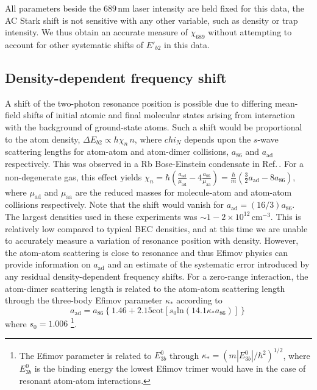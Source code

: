 All parameters beside the $689$\,nm laser intensity are held fixed for this data, the AC Stark shift is not sensitive  with any other variable, such as density or trap intensity.
We thus obtain an accurate measure of $\chi_{689}$ without attempting to account for other systematic shifts of $E'_{b2}$ in this data.

\subsection{Density-dependent frequency shift}
A shift of the two-photon resonance position is possible due to differing mean-field shifts of initial atomic and final molecular states arising from interaction with the background of ground-state atoms.
Such a shift would be proportional to the atom density, $\Delta E_{b2} \propto h \chi_n\,n$, where $chi_N$ depends upon the $s$-wave scattering lengths for atom-atom and atom-dimer collisions, $a_{86}$ and $a_{\text{ad}}$ respectively.
This was observed in a Rb Bose-Einstein condensate in Ref.\,\cite{Wynar2000}. 
For a non-degenerate gas, this effect yields $\chi_n=\hbar (\frac{a_{\text{ad}}}{\mu_{\text{ad}}}-4\frac{a_{86}}{\mu_{\text{aa}}})=\frac{\hbar}{m} (\frac{3 }{2}a_{\text{ad}}-8 a_{86})$, where $\mu_{\text{ad}}$ and $\mu_{\text{aa}}$ are the reduced masses for molecule-atom and atom-atom collisions respectively.
Note that the shift would vanish for $a_{\text{ad}}=(16/3) a_{86}$.
The largest densities used in these experiments was $\sim 1-2\times 10^{12}\,\mathrm{cm}^{-3}$.
This is relatively low compared to typical BEC densities, and at this time we are unable to accurately measure a variation of resonance position with density.
However, the atom-atom scattering is close to resonance and thus Efimov physics can provide information on $a_{\text{ad}}$ \cite{bha07,nen17} and an estimate of the systematic error introduced by any residual density-dependent frequency shifts.
For a zero-range interaction, the atom-dimer scattering length is related to the atom-atom scattering length through the three-body Efimov parameter $\kappa_*$ according to \cite{bha07}
\begin{equation}\label{Eq:EfimovMoleculAtomScatteringLength}
  a_{\text{ad}}=a_{86}\left\{1.46 + 2.15 \mathrm{cot}[s_0 \mathrm{ln} (14.1\kappa_* a_{86}) ]\right\}
\end{equation}
where $s_0=1.006$ \footnote{The Efimov parameter is related to $E^0_{3b}$ through $\kappa_*=(m|E^0_{3b}|/\hbar^2)^{1/2}$, where $E^0_{3b}$ is the binding energy the lowest Efimov trimer would have in the case of resonant atom-atom interactions.}.


